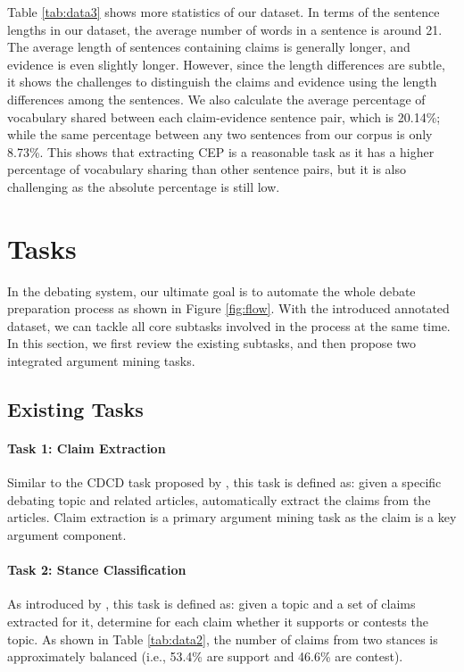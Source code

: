 \documentclass[11pt]{article}
\begin{document}
Table \ref{tab:data3} shows more statistics of our dataset.
In terms of the sentence lengths in our dataset, the average number of words in a sentence is around 21.
The average length of sentences containing claims is generally longer, and evidence is even slightly longer.
However, since the length differences are subtle, it shows the challenges to distinguish the claims and evidence using the length differences among the sentences.
We also calculate the average percentage of vocabulary shared between each claim-evidence sentence pair, which is 20.14\%; while the same percentage between any two sentences from our corpus is only 8.73\%.
This shows that extracting CEP is a reasonable task as it has a higher percentage of vocabulary sharing than other sentence pairs, but it is also challenging as the absolute percentage is still low.






\section{Tasks}

In the debating system, our ultimate goal is to automate the whole debate preparation process as shown in Figure \ref{fig:flow}. With the introduced annotated dataset, we can tackle all core subtasks involved in the process at the same time. In this section, we first review the existing subtasks, and then propose two integrated argument mining tasks.

\subsection{Existing Tasks}
\paragraph{Task 1: Claim Extraction}
Similar to the CDCD task proposed by \citet{levy2014context}, this task is defined as: given a specific debating topic and related articles, automatically extract the claims from the articles.
Claim extraction is a primary argument mining task as the claim is a key argument component.

\paragraph{Task 2: Stance Classification}
As introduced by \citet{bar2017stance}, this task is defined as: given a topic and a set of claims extracted for it, determine for each claim whether it supports or contests the topic.
As shown in Table \ref{tab:data2}, the number of claims from two stances is approximately balanced (i.e., 53.4\% are support and 46.6\% are contest).
\end{document}
